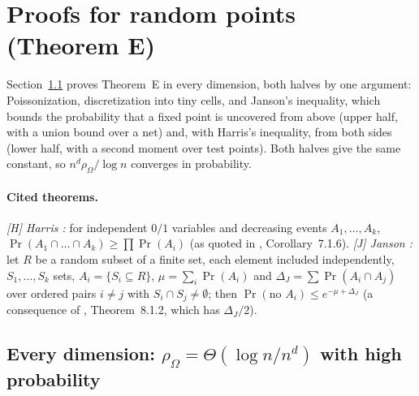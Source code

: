 \section{Proofs for random points (Theorem E)}\label{app:C}

\newcommand{\Cone}{\mathbf{1}}
\newcommand{\Cout}{\mathrm{out}}
\newcommand{\Cin}{\mathrm{in}}
\newcommand{\CB}{\mathcal{B}}

\newcommand{\Cpr}{\operatorname{pr}}
\newcommand{\Caff}{\operatorname{aff}}

Section~\ref{sec:C-all-d} proves Theorem~E in every dimension, both halves by one argument: Poissonization,
discretization into tiny cells, and Janson's inequality, which bounds the probability that a fixed point is
uncovered from above (upper half, with a union bound over a net) and, with Harris's inequality, from both
sides (lower half, with a second moment over test points). Both halves give the same constant, so
$n^d\rho_\Omega/\log n$ converges in probability.

\paragraph{Cited theorems.} \emph{[H] Harris \cite{Harris}:} for independent $0/1$ variables and decreasing
events $A_1, \dots, A_k$, $\Pr(A_1 \cap \dots \cap A_k) \ge \prod \Pr(A_i)$ (as quoted in \cite{ZhaoNotes}, Corollary~7.1.6). \emph{[J] Janson \cite{Janson}:} let $R$ be
a random subset of a finite set, each element included independently, $S_1, \dots, S_k$ sets,
$A_i = \{S_i \subseteq R\}$, $\mu = \sum_i\Pr(A_i)$ and $\Delta_J = \sum\Pr(A_i \cap A_j)$ over ordered pairs $i \ne j$
with $S_i \cap S_j \ne \emptyset$; then $\Pr(\text{no }A_i) \le e^{-\mu + \Delta_J}$ (a consequence of \cite{ZhaoNotes},
Theorem~8.1.2, which has $\Delta_J/2$).

\subsection{Every dimension: \texorpdfstring{$\rho_\Omega=\Theta(\log n/n^d)$}{rho\_Omega = Theta(log n/n\textasciicircum d)} with high probability}
\label{sec:C-all-d}\label{sec:C-upper}\label{sec:C-convex}\label{sec:C-lower}

